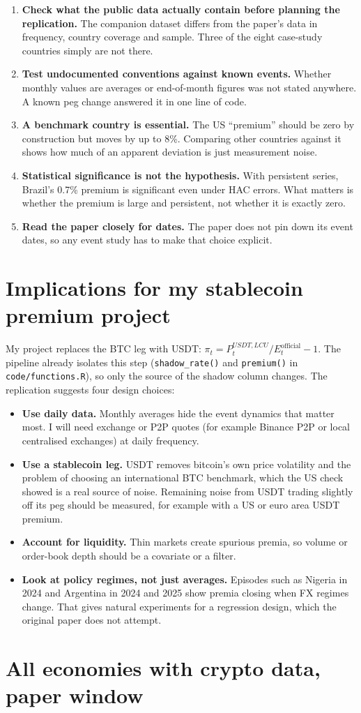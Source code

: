 \documentclass[11pt]{article}
\begin{document}
\begin{enumerate}
  \item \textbf{Check what the public data actually contain before planning the replication.} The companion dataset differs from the paper's data in frequency, country coverage and sample. Three of the eight case-study countries simply are not there.
  \item \textbf{Test undocumented conventions against known events.} Whether monthly values are averages or end-of-month figures was not stated anywhere. A known peg change answered it in one line of code.
  \item \textbf{A benchmark country is essential.} The US ``premium'' should be zero by construction but moves by up to 8\%. Comparing other countries against it shows how much of an apparent deviation is just measurement noise.
  \item \textbf{Statistical significance is not the hypothesis.} With persistent series, Brazil's 0.7\% premium is significant even under HAC errors. What matters is whether the premium is large and persistent, not whether it is exactly zero.
  \item \textbf{Read the paper closely for dates.} The paper does not pin down its event dates, so any event study has to make that choice explicit.
\end{enumerate}

\section{Implications for my stablecoin premium project}

My project replaces the BTC leg with USDT: $\pi_t = P_t^{USDT,LCU}/E_t^{\text{official}} - 1$. The pipeline already isolates this step (\texttt{shadow\_rate()} and \texttt{premium()} in \texttt{code/functions.R}), so only the source of the shadow column changes. The replication suggests four design choices:
\begin{itemize}
  \item \textbf{Use daily data.} Monthly averages hide the event dynamics that matter most. I will need exchange or P2P quotes (for example Binance P2P or local centralised exchanges) at daily frequency.
  \item \textbf{Use a stablecoin leg.} USDT removes bitcoin's own price volatility and the problem of choosing an international BTC benchmark, which the US check showed is a real source of noise. Remaining noise from USDT trading slightly off its peg should be measured, for example with a US or euro area USDT premium.
  \item \textbf{Account for liquidity.} Thin markets create spurious premia, so volume or order-book depth should be a covariate or a filter.
  \item \textbf{Look at policy regimes, not just averages.} Episodes such as Nigeria in 2024 and Argentina in 2024 and 2025 show premia closing when FX regimes change. That gives natural experiments for a regression design, which the original paper does not attempt.
\end{itemize}

\appendix
\section{All economies with crypto data, paper window}
{\small }
\end{document}
